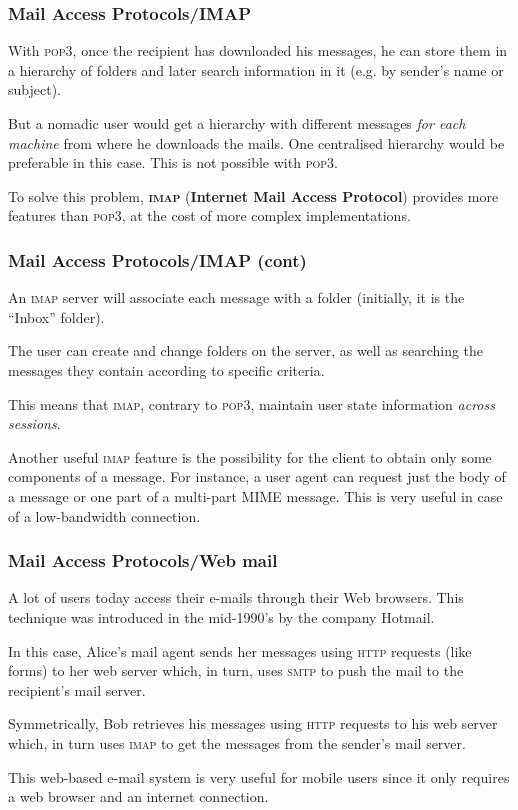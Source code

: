 %
\begin{frame}
\frametitle{Mail Access Protocols/IMAP}

With \textsc{pop3}, once the recipient has downloaded his messages, he
can store them in a hierarchy of folders and later search information
in it (e.g. by sender's name or subject).

But a nomadic user would get a hierarchy with different messages \emph{for
each machine} from where he downloads the mails. One centralised
hierarchy would be preferable in this case. This is not possible with
\textsc{pop3}.

To solve this problem, \textbf{\textsc{imap}} (\textbf{Internet Mail
  Access Protocol}) provides more features than \textsc{pop3}, at the
cost of more complex implementations.

\end{frame}


%
\begin{frame}
\frametitle{Mail Access Protocols/IMAP (cont)}

An \textsc{imap} server will associate each message with a folder
(initially, it is the ``Inbox'' folder).

The user can create and change folders on the server, as well as
searching the messages they contain according to specific criteria.

This means that \textsc{imap}, contrary to \textsc{pop3}, maintain
user state information \emph{across sessions}.

Another useful \textsc{imap} feature is the possibility for the client
to obtain only some components of a message. For instance, a user
agent can request just the body of a message or one part of a
multi-part MIME message. This is very useful in case of a
low-bandwidth connection.

\end{frame}

%
\begin{frame}
\frametitle{Mail Access Protocols/Web mail}

A lot of users today access their e-mails through their Web
browsers. This technique was introduced in the mid-1990's by the
company Hotmail.

In this case, Alice's mail agent sends her messages using
\textsc{http} requests (like forms) to her web server which, in turn,
uses \textsc{smtp} to push the mail to the recipient's mail server.

Symmetrically, Bob retrieves his messages using \textsc{http} requests
to his web server which, in turn uses \textsc{imap} to get the messages
from the sender's mail server.

This web-based e-mail system is very useful for mobile users since it
only requires a web browser and an internet connection.

\end{frame}

